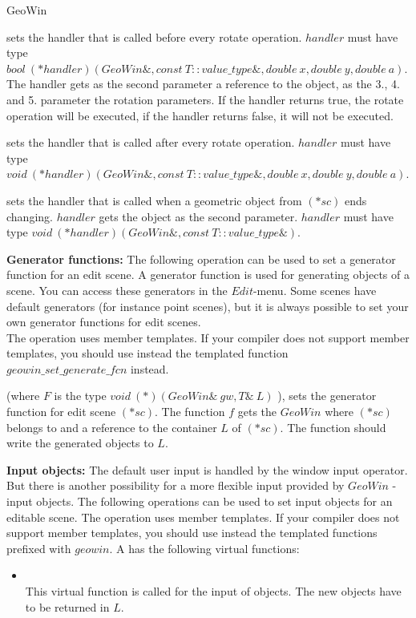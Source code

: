 \begin{ccRefClass}{GeoWin}
\begin{ccAdvanced}
{sets the handler that is called before every rotate operation.
$handler$ must have type $bool\ (*handler)(GeoWin\&, const\ T::value\_type \&, double\ x, double\ y, double\ a)$.
The handler gets as the second parameter a reference to the object, as the 3., 4. and 5. parameter
the rotation parameters. 
If the handler returns true, the rotate operation will be executed, if the handler returns false,
it will not be executed. 
}
  
{sets the handler that is called after every rotate operation.
$handler$ must have type $void\ (*handler)(GeoWin\&, const\ T::value\_type \&, double\ x, double\ y, double\ a)$. 
}
 
{sets the handler that is called when a geometric object from $(*sc)$ ends changing. 
$handler$ gets the object as the second parameter.
$handler$ must have type $void\ (*handler)(GeoWin\&, const\ T::value\_type \&)$.}

\end{ccAdvanced}

{
\medskip
{\bf Generator functions:}
The following operation can be used to set a generator function for an edit scene.
A generator function is used for generating objects of a scene. You can access these
generators in the $Edit$-menu. Some scenes have default generators (for instance
point scenes), but it is always possible to set your own generator functions for
edit scenes. \\
The operation uses member templates. 
If your compiler does not support member templates, you should use instead
the templated function $geowin\_set\_generate\_fcn$ instead. 
}
     
{ (where $F$ is the type
$void \ (*)(GeoWin\& \ gw,T\& \ L)$ ),
sets the generator function for edit scene $(*sc)$. 
The function $f$ gets the $GeoWin$ where $(*sc)$ belongs to and
a reference to the container $L$ of $(*sc)$. The function
should write the generated objects to $L$.
}

\medskip
{\bf Input objects:}
The default user input is handled by the window input operator.
But there is another possibility for a more flexible input provided by $GeoWin$ -
input objects.
The following operations can be used to set input objects for an editable scene.
The operation uses member templates. 
If your compiler does not support member templates, you should use instead
the templated functions prefixed with  $geowin$.
A  has the following virtual functions:
\begin{itemize}     
        \item {} \\
     This virtual function is called for the input of objects. The new objects have to be
     returned in $L$.
    

\end{itemize}
\end{ccRefClass}
